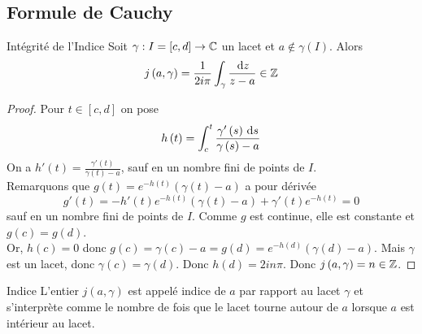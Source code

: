 \documentclass{cours}
\begin{document}
\subsection{Formule de Cauchy}
\begin{lemme}{Intégrité de l'Indice}{}
    Soit $\gamma : I = \left[c, d\right] \to \mathbb{C}$ un lacet et $a\notin \gamma\left(I\right)$. Alors
    \begin{equation*}
        j\left(a, \gamma\right) = \frac{1}{2i\pi}\int_{\gamma}\frac{{\rm \, d} z}{z - a} \in \mathbb{Z}
    \end{equation*}
\end{lemme}
\begin{proof}
    Pour $t \in \left[c, d\right]$ on pose 
    \begin{equation*}
        h\left(t\right) = \int_{c}^{t}\frac{\gamma'\left(s\right){\rm \, d} s}{\gamma\left(s\right) - a}
    \end{equation*}
    On a $h'\left(t\right) = \frac{\gamma'\left(t\right)}{\gamma\left(t\right)-a}$, sauf en un nombre fini de points de $I$. \\
    Remarquons que $g\left(t\right) = e^{-h\left(t\right)}\left(\gamma\left(t\right) - a\right)$ a pour dérivée
    \begin{equation*}
        g'\left(t\right)= - h'\left(t\right)e^{-h\left(t\right)}\left(\gamma\left(t\right)- a\right) + \gamma'\left(t\right)e^{-h\left(t\right)} = 0
    \end{equation*}
    sauf en un nombre fini de points de $I$. Comme $g$ est continue, elle est constante et $g\left(c\right) = g\left(d\right)$. \\
    Or, $h\left(c\right) = 0$ donc $g\left(c\right) = \gamma\left(c\right) - a = g\left(d\right) = e^{-h\left(d\right)}\left(\gamma\left(d\right) - a\right)$. Mais $\gamma$ est un lacet, donc $\gamma\left(c\right) = \gamma\left(d\right)$. Donc $h\left(d\right) = 2in\pi$. Donc $j\left(a, \gamma\right) = n \in \mathbb{Z}$. 
\end{proof}
\begin{définition}{Indice}{}
    L'entier $j\left(a, \gamma\right)$ est appelé indice de $a$ par rapport au lacet $\gamma$ et s'interprète comme le nombre de fois que le lacet tourne autour de $a$ lorsque $a$ est intérieur au lacet.
\end{définition}
\end{document}
